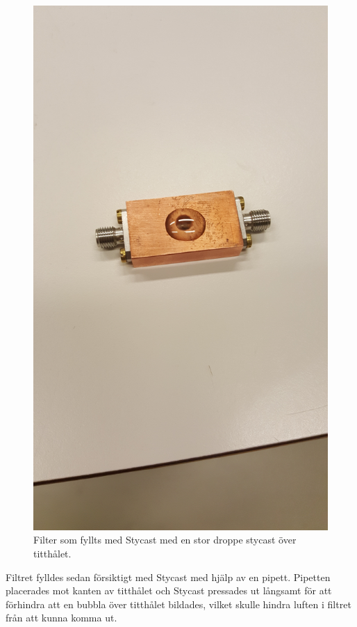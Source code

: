 \documentclass[main.tex]{subfiles}
\begin{document}
\begin{figure}
    \centering
    \includegraphics[angle=-90,trim=1250 200 1950 200,clip,width=0.975\linewidth]{figure/Filterbilder/stycast_fill.jpg}
    \caption{Filter som fyllts med Stycast med en stor droppe stycast över titthålet.}
    \label{fig:stycast_filled}
\end{figure}
Filtret fylldes sedan försiktigt med Stycast med hjälp av en pipett. Pipetten placerades mot kanten av titthålet och Stycast pressades ut långsamt för att förhindra att en bubbla över titthålet bildades, vilket skulle hindra luften i filtret från att kunna komma ut. 
\end{document}
